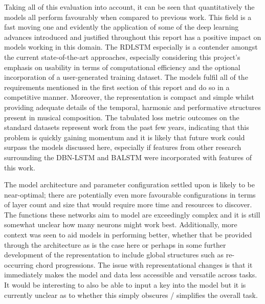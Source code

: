 \documentclass[12pt,]{article}
\begin{document}
Taking all of this evaluation into account, it can be seen that
quantitatively the models all perform favourably when compared to
previous work. This field is a fast moving one and evidently the
application of some of the deep learning advances introduced and
justified throughout this report has a positive impact on models working
in this domain. The RDLSTM especially is a contender amongst the current
state-of-the-art approaches, especially considering this project's
emphasis on usability in terms of computational efficiency and the
optional incorporation of a user-generated training dataset. The models
fulfil all of the requirements mentioned in the first section of this
report and do so in a competitive manner. Moreover, the representation
is compact and simple whilst providing adequate details of the temporal,
harmonic and performative structures present in musical composition. The
tabulated loss metric outcomes on the standard datasets represent work
from the past few years, indicating that this problem is quickly gaining
momentum and it is likely that future work could surpass the models
discussed here, especially if features from other research surrounding
the DBN-LSTM and BALSTM were incorporated with features of this work.

The model architecture and parameter configuration settled upon is
likely to be near-optimal; there are potentially even more favourable
configurations in terms of layer count and size that would require more
time and resources to discover. The functions these networks aim to
model are exceedingly complex and it is still somewhat unclear how many
neurons might work best. Additionally, more context was seen to aid
models in performing better, whether that be provided through the
architecture as is the case here or perhaps in some further development
of the representation to include global structures such as re-occurring
chord progressions. The issue with representational changes is that it
immediately makes the model and data less accessible and versatile
across tasks. It would be interesting to also be able to input a key
into the model but it is currently unclear as to whether this simply
obscures / simplifies the overall task.
\end{document}
